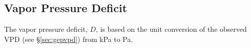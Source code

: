 \documentclass{myreport}
\begin{document}
\subsection{Vapor Pressure Deficit}
\label{sec:d}
The vapor pressure deficit, $D$, is based on the unit conversion of the observed VPD (see \S \ref{sec:gepvpd}) from kPa to Pa.

\end{document}
